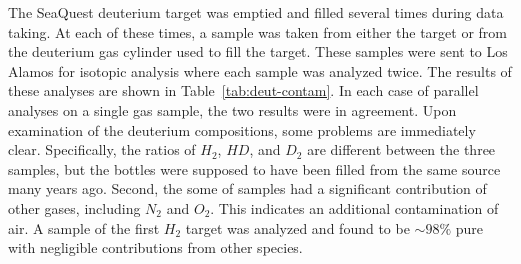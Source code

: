 The SeaQuest deuterium target was emptied and filled several times during data taking. At each of these times, a sample was taken from either the target or from the deuterium gas cylinder used to fill the target. These samples were sent to Los Alamos for isotopic analysis where each sample was analyzed twice. The results of these analyses are shown in Table~\ref{tab:deut-contam}. In each case of parallel analyses on a single gas sample, the two results were in agreement. Upon examination of the deuterium compositions, some problems are immediately clear. Specifically, the ratios of $H_2$, $HD$, and $D_2$ are different between the three samples, but the bottles were supposed to have been filled from the same source many years ago. Second, the some of samples had a significant contribution of other gases, including $N_2$ and $O_2$. This indicates an additional contamination of air. A sample of the first $H_2$ target was analyzed and found to be $\sim98\%$ pure with negligible contributions from other species.

